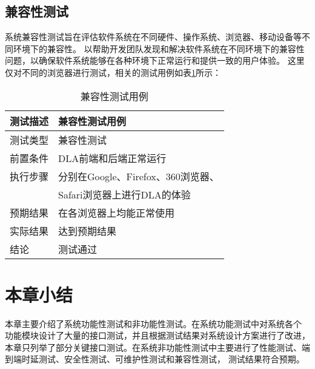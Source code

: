 \subsection{兼容性测试}

系统兼容性测试旨在评估软件系统在不同硬件、操作系统、浏览器、移动设备等不同环境下的兼容性。
以帮助开发团队发现和解决软件系统在不同环境下的兼容性问题，以确保软件系统能够在各种环境下正常运行和提供一致的用户体验。
这里仅对不同的浏览器进行测试，相关的测试用例如表\ref{tab:兼容性测试用例}所示：

\begin{table}[H]
  \centering
  \caption{兼容性测试用例}
  \label{tab:兼容性测试用例}
  \begin{tabular}{ll}
    \toprule
    测试描述         & 兼容性测试用例         \\
    \midrule
    测试类型         & 兼容性测试         \\
    前置条件         & DLA前端和后端正常运行   \\
    执行步骤         & 分别在Google、Firefox、360浏览器、  \\
                   & Safari浏览器上进行DLA的体验   \\
    预期结果         & 在各浏览器上均能正常使用  \\
    实际结果         & 达到预期结果           \\
    结论            & 测试通过           \\
    \bottomrule
  \end{tabular}
\end{table}

\section{本章小结}

本章主要介绍了系统功能性测试和非功能性测试。在系统功能测试中对系统各个
功能模块设计了大量的接口测试，并且根据测试结果对系统设计方案进行了改进，
本章只列举了部分关键接口测试。在系统非功能性测试中主要进行了性能测试、端到端时延测试、安全性测试、可维护性测试和兼容性测试，
测试结果符合预期。
